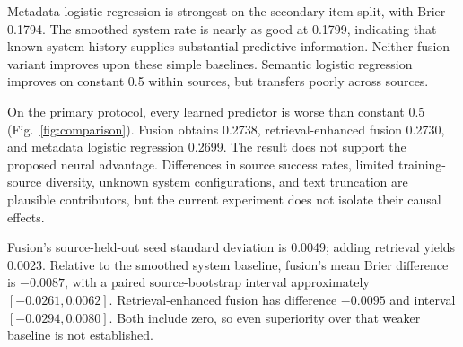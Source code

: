 \documentclass[conference]{IEEEtran}
\begin{document}
Metadata logistic regression is strongest on the secondary item split, with Brier 0.1794. The smoothed system rate is nearly as good at 0.1799, indicating that known-system history supplies substantial predictive information. Neither fusion variant improves upon these simple baselines. Semantic logistic regression improves on constant 0.5 within sources, but transfers poorly across sources.

On the primary protocol, every learned predictor is worse than constant 0.5 (Fig.~\ref{fig:comparison}). Fusion obtains 0.2738, retrieval-enhanced fusion 0.2730, and metadata logistic regression 0.2699. The result does not support the proposed neural advantage. Differences in source success rates, limited training-source diversity, unknown system configurations, and text truncation are plausible contributors, but the current experiment does not isolate their causal effects.

Fusion's source-held-out seed standard deviation is 0.0049; adding retrieval yields 0.0023. Relative to the smoothed system baseline, fusion's mean Brier difference is $-0.0087$, with a paired source-bootstrap interval approximately $[-0.0261,0.0062]$. Retrieval-enhanced fusion has difference $-0.0095$ and interval $[-0.0294,0.0080]$. Both include zero, so even superiority over that weaker baseline is not established.
\end{document}
